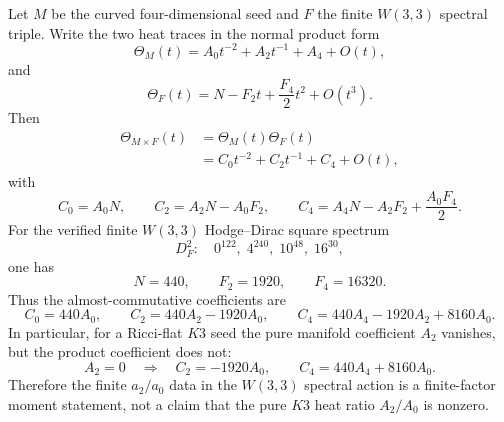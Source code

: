 
\makeatletter
{}
\makeatother
\providecommand{\PSp}{\mathrm{PSp}}
\providecommand{\Aut}{\mathrm{Aut}}
\providecommand{\spec}{\operatorname{spec}}


\begin{proposition}
\label{prop:ricci-flat-product-heat-slot}
Let $M$ be the curved four-dimensional seed and $F$ the finite $W(3,3)$ spectral
triple.  Write the two heat traces in the normal product form
\[
  \Theta_M(t)=A_0t^{-2}+A_2t^{-1}+A_4+O(t),
\]
and
\[
  \Theta_F(t)=N-F_2t+\frac{F_4}{2}t^2+O(t^3).
\]
Then
\[
\begin{aligned}
  \Theta_{M\times F}(t)&=\Theta_M(t)\Theta_F(t) \\
  &= C_0t^{-2}+C_2t^{-1}+C_4+O(t),
\end{aligned}
\]
with
\[
  C_0=A_0N,
  \qquad
  C_2=A_2N-A_0F_2,
  \qquad
  C_4=A_4N-A_2F_2+\frac{A_0F_4}{2}.
\]
For the verified finite $W(3,3)$ Hodge--Dirac square spectrum
\[
  D_F^2:\quad 0^{122},\;4^{240},\;10^{48},\;16^{30},
\]
one has
\[
  N=440,\qquad F_2=1920,\qquad F_4=16320.
\]
Thus the almost-commutative coefficients are
\[
  C_0=440A_0,\qquad
  C_2=440A_2-1920A_0,\qquad
  C_4=440A_4-1920A_2+8160A_0.
\]
In particular, for a Ricci-flat $K3$ seed the pure manifold coefficient
$A_2$ vanishes, but the product coefficient does not:
\[
  A_2=0
  \quad\Longrightarrow\quad
  C_2=-1920A_0,\qquad C_4=440A_4+8160A_0.
\]
Therefore the finite $a_2/a_0$ data in the $W(3,3)$ spectral action is a
finite-factor moment statement, not a claim that the pure $K3$ heat ratio
$A_2/A_0$ is nonzero.
\end{proposition}

